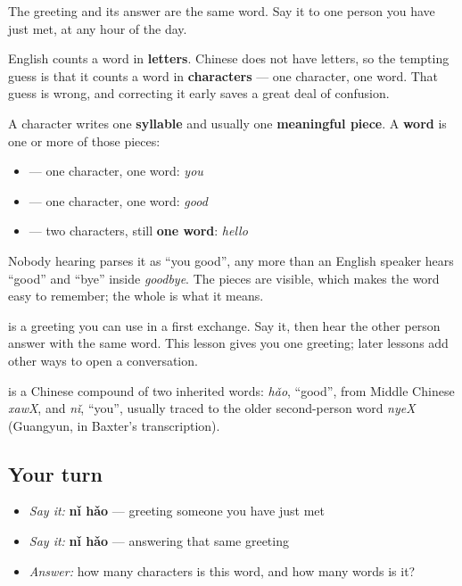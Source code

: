 The greeting and its answer are the same word. Say it to one person you have just met, at any hour of the day.

\begin{grammarlens}[title={Grammar Lens — a word can be more than one character}]
English counts a word in \textbf{letters}. Chinese does not have letters, so the tempting guess is that it counts a word in \textbf{characters} — one character, one word. That guess is wrong, and correcting it early saves a great deal of confusion.

A character writes one \textbf{syllable} and usually one \textbf{meaningful piece}. A \textbf{word} is one or more of those pieces:

\begin{itemize}
\raggedright
  \item \textbf{} — one character, one word: \emph{you}
  \item \textbf{} — one character, one word: \emph{good}
  \item \textbf{} — two characters, still \textbf{one word}: \emph{hello}
\end{itemize}

Nobody hearing \textbf{} parses it as \textquotedblleft{}you good\textquotedblright{}, any more than an English speaker hears \textquotedblleft{}good\textquotedblright{} and \textquotedblleft{}bye\textquotedblright{} inside \emph{goodbye}. The pieces are visible, which makes the word easy to remember; the whole is what it means.
\end{grammarlens}

\begin{culture}
\textbf{} is a greeting you can use in a first exchange. Say it, then hear the other person answer with the same word. This lesson gives you one greeting; later lessons add other ways to open a conversation.
\end{culture}

\begin{cousinweb}
\textbf{} is a Chinese compound of two inherited words: \emph{hǎo}, \textquotedblleft{}good\textquotedblright{}, from Middle Chinese \emph{xawX}, and \emph{nǐ}, \textquotedblleft{}you\textquotedblright{}, usually traced to the older second-person word \emph{nyeX} (Guangyun, in Baxter's transcription).
\end{cousinweb}

\subsection*{Your turn}
\begin{itemize}
\raggedright
  \item \emph{Say it:} \textbf{nǐ hǎo} — greeting someone you have just met
  \item \emph{Say it:} \textbf{nǐ hǎo} — answering that same greeting
  \item \emph{Answer:} how many characters is this word, and how many words is it?
\end{itemize}

